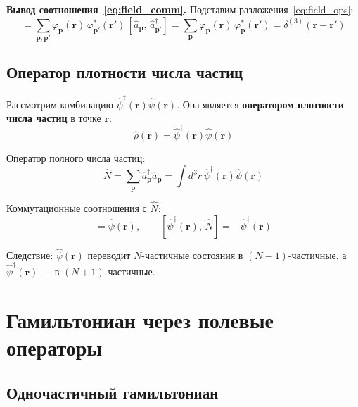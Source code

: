 \documentclass[../general/general]{subfiles}
\begin{document}
\textbf{Вывод соотношения~\eqref{eq:field_comm}.} Подставим разложения~\eqref{eq:field_ops}:
\begin{equation}
    [\hat{\psi}(\mathbf{r}),\,\hat{\psi}^\dagger(\mathbf{r}')] = \sum_{\mathbf{p},\mathbf{p}'}\varphi_\mathbf{p}(\mathbf{r})\,\varphi^*_{\mathbf{p}'}(\mathbf{r}')\,[\hat{a}_\mathbf{p},\,\hat{a}^\dagger_{\mathbf{p}'}]
    = \sum_\mathbf{p}\varphi_\mathbf{p}(\mathbf{r})\,\varphi^*_\mathbf{p}(\mathbf{r}') = \delta^{(3)}(\mathbf{r}-\mathbf{r}')
\end{equation}

\subsection{Оператор плотности числа частиц}

Рассмотрим комбинацию $\hat{\psi}^\dagger(\mathbf{r})\hat{\psi}(\mathbf{r})$. Она является \textbf{оператором плотности числа частиц} в точке $\mathbf{r}$:
\begin{equation}
    \hat{\rho}(\mathbf{r}) = \hat{\psi}^\dagger(\mathbf{r})\hat{\psi}(\mathbf{r})
\end{equation}

Оператор полного числа частиц:
\begin{equation}
    \hat{N} = \sum_\mathbf{p}\hat{a}^\dagger_\mathbf{p}\hat{a}_\mathbf{p} = \int d^3r\,\hat{\psi}^\dagger(\mathbf{r})\hat{\psi}(\mathbf{r})
    \label{eq:N_field}
\end{equation}

Коммутационные соотношения с $\hat{N}$:
\begin{equation}
    [\hat{\psi}(\mathbf{r}),\,\hat{N}] = \hat{\psi}(\mathbf{r}), \qquad [\hat{\psi}^\dagger(\mathbf{r}),\,\hat{N}] = -\hat{\psi}^\dagger(\mathbf{r})
\end{equation}

Следствие: $\hat{\psi}(\mathbf{r})$ переводит $N$-частичные состояния в $(N-1)$-частичные, а $\hat{\psi}^\dagger(\mathbf{r})$ --- в $(N+1)$-частичные.



\section{Гамильтониан через полевые операторы}

\subsection{Однoчастичный гамильтониан}
\end{document}
